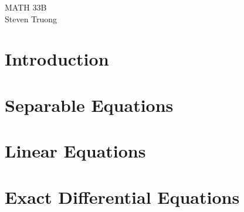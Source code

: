 \documentclass[12pt, twoside]{article}
\newcommand{\noskip}
{
	\setlength\abovedisplayskip{0pt}
	\setlength\belowdisplayskip{0pt}
}
\theoremstyle{definition}
\begin{document}
\noskip

\pagestyle{empty}
\begin{center}
	\vspace*{10\baselineskip}
	\LARGE MATH 33B \\
	\Large Steven Truong
\end{center}
\cleardoublepage

\tableofcontents
\cleardoublepage
\setcounter{page}{1}

\pagestyle{fancy}
\fancyhf{}
\renewcommand{\sectionmark}[1]{\markright{#1}}
\fancyhead[LE, RO]{\thepage}
\fancyhead[RE, LO]{\rightmark}

\section{Introduction}%


\clearpage
\section{Separable Equations}


\section{Linear Equations}

	
\section{Exact Differential Equations}

\end{document}
